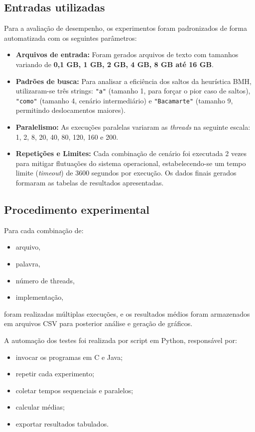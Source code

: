 \documentclass[10pt,twocolumn,a4paper]{article}
\begin{document}
\subsection{Entradas utilizadas}

Para a avaliação de desempenho, os experimentos foram padronizados de forma automatizada com os seguintes parâmetros:
\begin{itemize}[leftmargin=*]
\item \textbf{Arquivos de entrada:} Foram gerados arquivos de texto com tamanhos variando de \textbf{0,1 GB, 1 GB, 2 GB, 4 GB, 8 GB até 16 GB}.
\item \textbf{Padrões de busca:} Para analisar a eficiência dos saltos da heurística BMH, utilizaram-se três strings: \texttt{"a"} (tamanho 1, para forçar o pior caso de saltos), \texttt{"como"} (tamanho 4, cenário intermediário) e \texttt{"Bacamarte"} (tamanho 9, permitindo deslocamentos maiores).
\item \textbf{Paralelismo:} As execuções paralelas variaram as \textit{threads} na seguinte escala: 1, 2, 8, 20, 40, 80, 120, 160 e 200.
\item \textbf{Repetições e Limites:} Cada combinação de cenário foi executada 2 vezes para mitigar flutuações do sistema operacional, estabelecendo-se um tempo limite (\textit{timeout}) de 3600 segundos por execução. Os dados finais gerados formaram as tabelas de resultados apresentadas.
\end{itemize}

\subsection{Procedimento experimental}

Para cada combinação de:
\begin{itemize}[leftmargin=*]
    \item arquivo,
    \item palavra,
    \item número de threads,
    \item implementação,
\end{itemize}

foram realizadas múltiplas execuções, e os resultados médios foram armazenados em arquivos CSV para posterior análise e geração de gráficos.

A automação dos testes foi realizada por script em Python, responsável por:
\begin{itemize}[leftmargin=*]
    \item invocar os programas em C e Java;
    \item repetir cada experimento;
    \item coletar tempos sequenciais e paralelos;
    \item calcular médias;
    \item exportar resultados tabulados.
\end{itemize}
\end{document}
